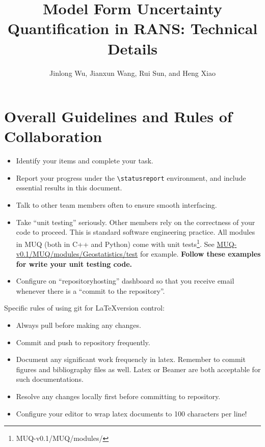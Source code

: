 \documentclass[paper = letter, fontsize = 11pt]{scrartcl} %
\begin{document}
\makeatletter

\setlength{\@fptop}{0pt}
\makeatother

\title{Model Form Uncertainty Quantification in RANS: Technical Details}
\author{Jinlong Wu, Jianxun Wang, Rui Sun, and Heng Xiao} 

\maketitle
\tableofcontents
\listoftodos

\section*{Overall Guidelines and Rules of Collaboration}
\begin{itemize}
\item Identify your items and complete your task.
\item Report your progress under the \verb+\statusreport+ environment, and include essential results
  in this document.
\item Talk to other team members often to ensure smooth interfacing.
\item Take ``unit testing'' seriously. Other members rely on the correctness of your code to
  proceed. This is standard software engineering practice.  All modules in MUQ (both in C++ and
  Python) come with unit tests\footnote{MUQ-v0.1/MUQ/modules/}. See
  \url{MUQ-v0.1/MUQ/modules/Geostatistics/test} for example. \textbf{Follow these examples for write
  your unit testing code.}
\item Configure on “repositoryhosting” dashboard so that you receive email whenever there is a
  ``commit to the repository''.
\end{itemize}

Specific rules of using git for \LaTeX version control:
\begin{itemize}
 \item Always pull before making any changes.
 \item Commit and push to repository frequently.
 \item Document any significant work frequencly in latex. Remember to commit figures and bibliography
   files as well.  Latex or Beamer are both acceptable for such documentations.  
 \item Resolve any changes locally first before
   committing to repository.  
   \item Configure your editor to wrap latex documents to 100 characters per line!
\end{itemize}
\end{document}
